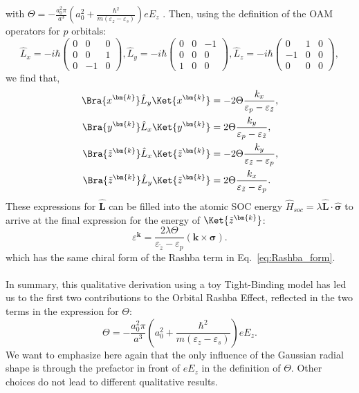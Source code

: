 with $\Theta = -\frac{a_0^2 \pi}{a^3}\left(a_0^2 + \frac{\hbar^2}{m(\varepsilon_z - \varepsilon_s)}\right) e E_z$ .
Then, using the definition of the OAM operators for $p$ orbitals:
\begin{equation}
	\hat{L}_x =-i\hbar\left(\begin{matrix}0&0&0\\0&0&1\\0&-1&0\end{matrix}\right), \hat{L}_y = -i\hbar \left(\begin{matrix}0&0&-1\\0&0&0\\1&0&0\end{matrix}\right), \hat{L}_z =-i\hbar\left(\begin{matrix}0&1&0\\-1&0&0\\0&0&0\end{matrix}\right),
\end{equation}
we find that,
\begin{align}
	\label{eq:oam_from_k}
	\Bra{x^{\bm{k}}} \hat{L}_y \Ket{x^{\bm{k}}} &= -2 \Theta \frac{k_x}{\varepsilon_p - \varepsilon_{\tilde{z}}},\\
	\Bra{y^{\bm{k}}} \hat{L}_x \Ket{y^{\bm{k}}} &= 2 \Theta \frac{k_y}{\varepsilon_p - \varepsilon_{\tilde{z}}},\\
	\Bra{\tilde{z}^{\bm{k}}} \hat{L}_x \Ket{\tilde{z}^{\bm{k}}} &= - 2 \Theta \frac{k_y}{\varepsilon_{\tilde{z}} - \varepsilon_p},\\ 
	\Bra{\tilde{z}^{\bm{k}}} \hat{L}_y \Ket{\tilde{z}^{\bm{k}}} &= 2 \Theta \frac{k_x}{\varepsilon_{\tilde{z}}-\varepsilon_p}\label{eq:oam_from_k_final}.
\end{align}
These expressions for $\hat{\bm{L}}$ can be filled into the atomic SOC energy $\hat{H}_{soc}= \lambda \hat{\bm{L}} \cdot \hat{\bm{\sigma}}$ to arrive at the final expression for the energy of $\Ket{\tilde{z}^{\bm{k}}}$:
\begin{equation}
	\label{eq:Rashba_from_OAM}
	\varepsilon^{\bm{k}} = \frac{2 \lambda \Theta}{\varepsilon_{\tilde{z}}-\varepsilon_p}(\bm{k} \times \bm{\sigma}).
\end{equation}
which has the same chiral form of the Rashba term in Eq.~\eqref{eq:Rashba_form}.
\\\\
In summary, this qualitative derivation using a toy Tight-Binding model has led us to the first two contributions to the Orbital Rashba Effect, reflected in the two terms in the expression for $\Theta$:
\begin{equation}
	\label{eq:Rashba_theta}
\Theta = -\frac{a_0^2 \pi}{a^3}\left(a_0^2 + \frac{\hbar^2}{m(\varepsilon_z - \varepsilon_s)}\right) e E_z.
\end{equation}
We want to emphasize here again that the only influence of the Gaussian radial shape is through the prefactor in front of $e E_z$ in the definition of $\Theta$.
Other choices do not lead to different qualitative results.

